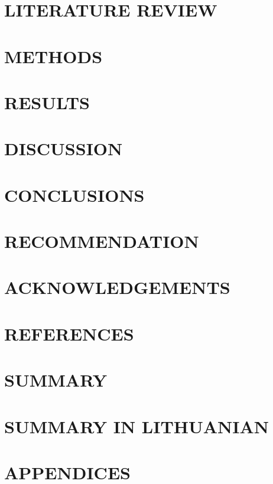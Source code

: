 \documentclass[11pt]{report}
\begin{document}
\chapter{LITERATURE REVIEW}


\chapter{METHODS}


\chapter{RESULTS}


\chapter{DISCUSSION}

\chapter{CONCLUSIONS}

\chapter{RECOMMENDATION}

\chapter{ACKNOWLEDGEMENTS}

\chapter{REFERENCES}
\printbibliography[heading=none]

\chapter{SUMMARY}

\chapter{SUMMARY IN LITHUANIAN}

\chapter{APPENDICES}

\end{document}
